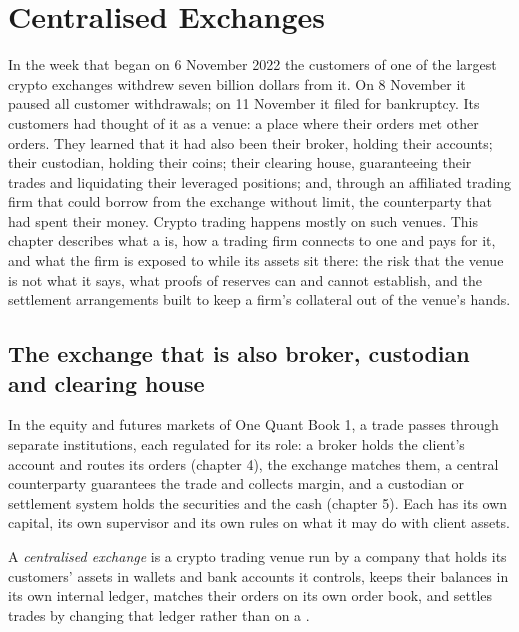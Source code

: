 \chapter{Centralised Exchanges}\label{ch:m3:centralised-exchanges}

In the week that began on 6 November 2022 the customers of one of the largest crypto exchanges withdrew
seven billion dollars from it. On 8 November it paused all customer withdrawals; on 11 November it filed
for bankruptcy. Its customers had thought of it as a venue: a place where
their orders met other orders. They learned that it had also been their broker, holding their accounts;
their custodian, holding their coins; their clearing house, guaranteeing their trades and liquidating
their leveraged positions; and, through an affiliated trading firm that could borrow from the exchange
without limit, the counterparty that had spent their money. Crypto trading happens mostly on such
venues. This chapter describes what a  is, how a trading firm connects to one and
pays for it, and what the firm is exposed to while its assets sit there: the risk that the venue is
not what it says, what proofs of reserves can and cannot establish, and the settlement arrangements
built to keep a firm's collateral out of the venue's hands.

\section{The exchange that is also broker, custodian and clearing house}

In the equity and futures markets of One Quant Book 1, a trade passes through separate institutions,
each regulated for its role: a broker holds the client's account and routes its orders (chapter 4), the
exchange matches them, a central counterparty guarantees the trade and collects margin, and a custodian
or settlement system holds the securities and the cash (chapter 5). Each has its own capital, its own
supervisor and its own rules on what it may do with client assets.

\begin{definition}\label{def:m3:centralised-exchanges:cex}
A \emph{centralised exchange} is a crypto trading venue run by a company
that holds its customers' assets in wallets and bank accounts it controls, keeps their balances in its
own internal ledger, matches their orders on its own order book, and settles trades by changing that
ledger rather than on a .
\end{definition}

